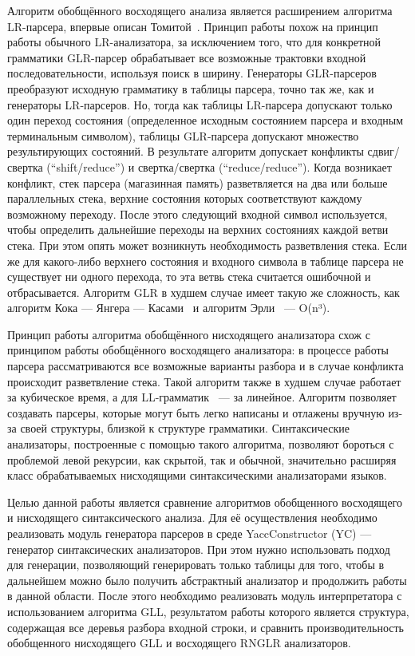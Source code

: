 Алгоритм обобщённого восходящего анализа является расширением алгоритма LR-парсера, впервые описан Томитой~\cite{tomita}. Принцип работы похож на принцип работы обычного LR-анализатора, за исключением того, что для конкретной грамматики GLR-парсер обрабатывает все возможные трактовки входной последовательности, используя поиск в ширину. Генераторы GLR-парсеров преобразуют исходную грамматику в таблицы парсера, точно так же, как и генераторы LR-парсеров. Но, тогда как таблицы LR-парсера допускают только один переход состояния (определенное исходным состоянием парсера и входным терминальным символом), таблицы GLR-парсера допускают множество результирующих состояний. В результате алгоритм допускает конфликты сдвиг/свертка (“shift/reduce”) и свертка/свертка (“reduce/reduce”). Когда возникает конфликт, стек парсера (магазинная память) разветвляется на два или больше параллельных стека, верхние состояния которых соответствуют каждому возможному переходу. После этого следующий входной символ используется, чтобы определить дальнейшие переходы на верхних состояниях каждой ветви стека. При этом опять может возникнуть необходимость разветвления стека. Если же для какого-либо верхнего состояния и входного символа в таблице парсера не существует ни одного перехода, то эта ветвь стека считается ошибочной и отбрасывается. Алгоритм GLR в худшем случае имеет такую же сложность, как алгоритм Кока --- Янгера --- Касами~\cite{earley2} и алгоритм Эрли~\cite{earley} --- O(n³).

Принцип работы алгоритма обобщённого нисходящего анализатора схож с принципом работы обобщённого восходящего анализатора: в процессе работы парсера рассматриваются все возможные варианты разбора и в случае конфликта происходит разветвление стека. Такой алгоритм также в худшем случае работает за кубическое время, а для LL-грамматик~\cite{aho} --- за линейное. Алгоритм позволяет создавать парсеры, которые могут быть легко написаны и отлажены вручную из-за своей структуры, близкой к структуре грамматики. Синтаксические анализаторы, построенные с помощью такого алгоритма, позволяют бороться с проблемой левой рекурсии, как скрытой, так и обычной, значительно расширяя класс обрабатываемых нисходящими синтаксическими анализаторами языков.

Целью данной работы является сравнение алгоритмов обобщенного восходящего и нисходящего синтаксического анализа. Для её осуществления необходимо реализовать модуль генератора парсеров в среде YaccConstructor (YC) --- генератор синтаксических анализаторов. При этом нужно использовать подход для генерации, позволяющий генерировать только таблицы для того, чтобы в дальнейшем можно было получить абстрактный анализатор и продолжить работы в данной области. После этого необходимо реализовать модуль интерпретатора с использованием алгоритма GLL, результатом работы которого является структура, содержащая все деревья разбора входной строки, и сравнить производительность обобщенного нисходящего GLL и восходящего RNGLR анализаторов.
